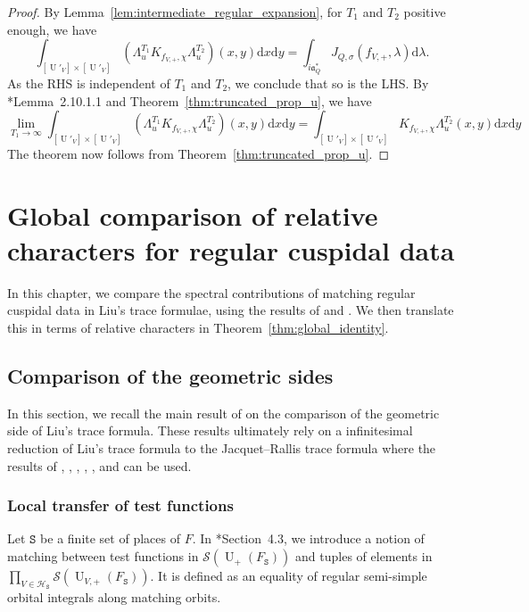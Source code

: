 \documentclass[letterpaper,11pt]{amsart}
\newcommand{\fa}{\mathfrak{a}}
\newcommand{\cH}{\mathcal{H}}
\newcommand{\cS}{\mathcal{S}}
\newcommand{\rd}{\mathrm{d}}
\newcommand{\tS}{\mathtt{S}}
\newcommand{\<}{\negthickspace}
\DeclareMathOperator{\U}{U}
\theoremstyle{definition}
\theoremstyle{plain}
\theoremstyle{remark}
\numberwithin{equation}{section}
\begin{document}
\begin{proof}
    By Lemma~\ref{lem:intermediate_regular_expansion}, for $T_1$ and $T_2$ positive enough, we have
    \[
    \int_{[\U'_V] \times [\U'_V]} (\Lambda^{T_1}_u K_{f_{V,+}, \chi} \Lambda^{T_2}_u)
    (x, y) \rd x \rd y =
    \int_{i \fa_Q^*} J_{Q, \sigma}( f_{V,+},\lambda) \rd \lambda.
    \]
As the RHS is independent of $T_1$ and $T_2$, we conclude that so is the LHS. By \cite{BPCZ}*{Lemma~2.10.1.1} and Theorem~\ref{thm:truncated_prop_u}, we have
\begin{equation*}
    \lim_{T_1 \to \infty } \int_{[\U'_V] \times [\U'_V]} (\Lambda^{T_1}_u K_{f_{V,+}, \chi} \Lambda^{T_2}_u)
    (x, y) \rd x \rd y = \int_{[\U'_V] \times [\U'_V]} K_{f_{V,+}, \chi} \Lambda^{T_2}_u
    (x, y) \rd x \rd y
\end{equation*}
The theorem now follows from Theorem~\ref{thm:truncated_prop_u}.
\end{proof}

\section{Global comparison of relative characters for regular cuspidal data}
\label{sec:Global_comparison}


\label{sec:comparison}

In this chapter, we compare the spectral contributions of matching regular cuspidal data in Liu's trace formulae, using the results of \cite{BLX1} and \cite{BLX2}. We then translate this in terms of relative characters in Theorem~\ref{thm:global_identity}.

\subsection{Comparison of the geometric sides}
\label{sec:comparison_geom}

In this section, we recall the main result of \cite{BLX2} on the comparison of the geometric side of Liu's trace formula. These results ultimately rely on a infinitesimal reduction of Liu's trace formula to the Jacquet--Rallis trace formula where the results of \cite{Zhang1}, \cite{Xue1}, \cite{Xue3}, \cite{Yun}, \cite{BP3}, \cite{Zhang3} and \cite{CZ} can be used.

\subsubsection{Local transfer of test functions} Let $\tS$ be a finite set of places of $F$. In \cite{BLX2}*{Section~4.3}, we introduce a notion of matching between test functions in $\cS(\U_+(F_\tS))$ and tuples of elements in $\prod_{V \in \cH_\tS} \cS(\U_{V,+}(F_\tS))$. It is defined as an equality of regular semi-simple orbital integrals along matching orbits. 
\end{document}
